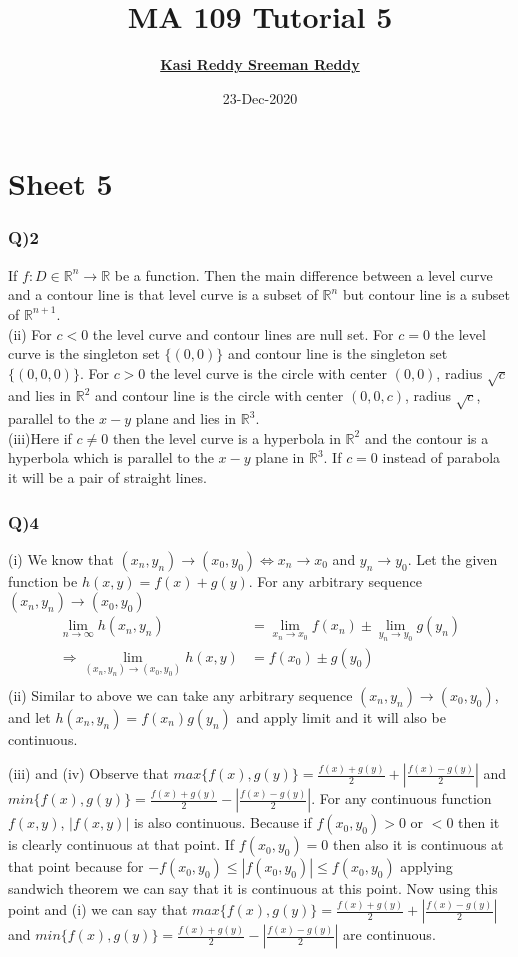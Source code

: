 \documentclass[11pt]{beamer}
\author[K. Sreeman Reddy]{\href{http://iamsreeman.github.io/}{\textbf{Kasi Reddy Sreeman Reddy}}\linebreak\text{2nd year physics student}\linebreak\text{\href{http://iamsreeman.github.io/MA109}{http://iamsreeman.github.io/MA109}}}
\title{MA 109 Tutorial 5}
\institute[]{IIT Bombay}
\date{23-Dec-2020}
\begin{document}
\begin{frame}
\titlepage
\end{frame}


\section{Sheet 5}
\begin{frame}
\frametitle{Q)2}
If $f:D\in\mathbb{R}^n\to\mathbb{R}$ be a function. Then the main difference between a level curve and a contour line is that level curve is a subset of $\mathbb{R}^n$ but contour line is a subset of $\mathbb{R}^{n+1}$.\\
(ii) For $c<0$ the level curve and contour lines are null set. For $c=0$ the level curve is the singleton set $\{(0,0)\}$ and contour line is the singleton set $\{(0,0,0)\}$. For $c>0$ the level curve is the circle with center $(0,0)$, radius $\sqrt{c}$ and lies in $\mathbb{R}^2$ and contour line is the circle with center $(0,0,c)$, radius $\sqrt{c}$, parallel to the $x-y$ plane and lies in $\mathbb{R}^3$.\\
(iii)Here if $c\neq 0$ then the level curve is a hyperbola in $\mathbb{R}^2$ and the contour is a hyperbola which is parallel to the $x-y$ plane in $\mathbb{R}^3$. If $c=0$ instead of parabola it will be a pair of straight lines.
\end{frame}
\begin{frame}
\frametitle{Q)4}
(i) We know that $(x_n,y_n)\to(x_0,y_0)\Leftrightarrow x_n\to x_0$ and $y_n\to y_0 $. Let the given function be $h(x,y)=f(x)+g(y)$. For any arbitrary sequence $(x_n,y_n)\to(x_0,y_0)$
\begin{align*}
\underset{n\to\infty}{\lim} h(x_n,y_n)&=\underset{x_n\to x_0}{\lim}f(x_n)\pm \underset{y_n\to y_0}{\lim}g(y_n)\\
\Rightarrow \underset{(x_n,y_n)\to(x_0,y_0)}{\lim} h(x,y)&=f(x_0)\pm g(y_0)\\
\end{align*}
(ii) Similar to above we can take any arbitrary sequence $(x_n,y_n)\to(x_0,y_0)$, and let $h(x_n,y_n)=f(x_n)g(y_n)$ and apply limit and it will also be continuous.
\end{frame}
\begin{frame}
(iii) and (iv) Observe that $max\{f(x),g(y)\}=\frac{f(x)+g(y)}{2}+\left|\frac{f(x)-g(y)}{2}\right|$ and $min\{f(x),g(y)\}=\frac{f(x)+g(y)}{2}-\left|\frac{f(x)-g(y)}{2}\right|$. For any continuous function $f(x,y)$, $|f(x,y)|$ is also continuous. Because if $f(x_0,y_0)>0$ or $<0$ then it is clearly continuous at that point. If $f(x_0,y_0)=0$ then also it is continuous at that point because for $-f(x_0,y_0)\leq |f(x_0,y_0)|\leq f(x_0,y_0)$ applying sandwich theorem we can say that it is continuous at this point. Now using this point and (i) we can say that $max\{f(x),g(y)\}=\frac{f(x)+g(y)}{2}+\left|\frac{f(x)-g(y)}{2}\right|$ and $min\{f(x),g(y)\}=\frac{f(x)+g(y)}{2}-\left|\frac{f(x)-g(y)}{2}\right|$ are continuous.
\end{frame}
\end{document}
